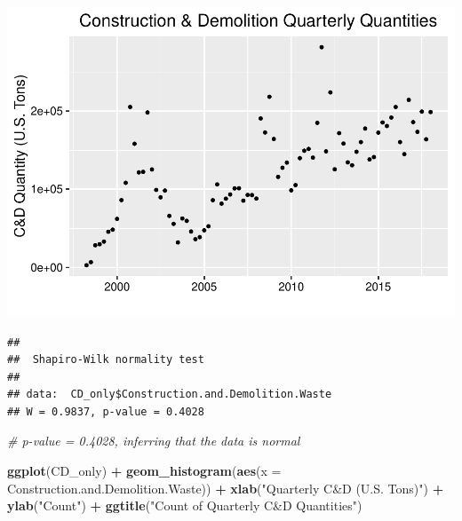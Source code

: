 \documentclass[12pt,]{article}
\newenvironment{Shaded}{\begin{snugshade}}{\end{snugshade}}
\newcommand{\KeywordTok}[1]{\textcolor[rgb]{0.13,0.29,0.53}{\textbf{#1}}}
\newcommand{\DataTypeTok}[1]{\textcolor[rgb]{0.13,0.29,0.53}{#1}}
\newcommand{\StringTok}[1]{\textcolor[rgb]{0.31,0.60,0.02}{#1}}
\newcommand{\CommentTok}[1]{\textcolor[rgb]{0.56,0.35,0.01}{\textit{#1}}}
\newcommand{\OperatorTok}[1]{\textcolor[rgb]{0.81,0.36,0.00}{\textbf{#1}}}
\newcommand{\NormalTok}[1]{#1}
\begin{document}
\includegraphics{SKo_Project_Template_files/figure-latex/Test3_1-1.pdf}

\begin{Shaded}
\end{Shaded}

\begin{verbatim}
## 
##  Shapiro-Wilk normality test
## 
## data:  CD_only$Construction.and.Demolition.Waste
## W = 0.9837, p-value = 0.4028
\end{verbatim}

\begin{Shaded}
\begin{Highlighting}[]
\CommentTok{# p-value = 0.4028, inferring that the data is normal}

\KeywordTok{ggplot}\NormalTok{(CD_only) }\OperatorTok{+}
\StringTok{  }\KeywordTok{geom_histogram}\NormalTok{(}\KeywordTok{aes}\NormalTok{(}\DataTypeTok{x =}\NormalTok{ Construction.and.Demolition.Waste)) }\OperatorTok{+}\StringTok{ }
\StringTok{  }\KeywordTok{xlab}\NormalTok{(}\StringTok{"Quarterly C&D (U.S. Tons)"}\NormalTok{) }\OperatorTok{+}
\StringTok{  }\KeywordTok{ylab}\NormalTok{(}\StringTok{"Count"}\NormalTok{) }\OperatorTok{+}\StringTok{ }
\StringTok{  }\KeywordTok{ggtitle}\NormalTok{(}\StringTok{"Count of Quarterly C&D Quantities"}\NormalTok{)}
\end{Highlighting}
\end{Shaded}
\end{document}
